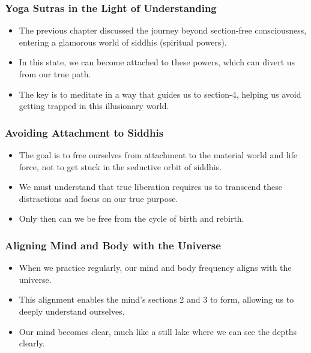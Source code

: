 \begin{frame}[fragile]\frametitle{Yoga Sutras in the Light of Understanding}
    \begin{itemize}
        \item The previous chapter discussed the journey beyond section-free consciousness, entering a glamorous world of siddhis (spiritual powers).
        \item In this state, we can become attached to these powers, which can divert us from our true path.
        \item The key is to meditate in a way that guides us to section-4, helping us avoid getting trapped in this illusionary world.
    \end{itemize}
\end{frame}

\begin{frame}[fragile]\frametitle{Avoiding Attachment to Siddhis}
    \begin{itemize}
        \item The goal is to free ourselves from attachment to the material world and life force, not to get stuck in the seductive orbit of siddhis.
        \item We must understand that true liberation requires us to transcend these distractions and focus on our true purpose.
        \item Only then can we be free from the cycle of birth and rebirth.
    \end{itemize}
\end{frame}

\begin{frame}[fragile]\frametitle{Aligning Mind and Body with the Universe}
    \begin{itemize}
        \item When we practice regularly, our mind and body frequency aligns with the universe.
        \item This alignment enables the mind's sections 2 and 3 to form, allowing us to deeply understand ourselves.
        \item Our mind becomes clear, much like a still lake where we can see the depths clearly.
    \end{itemize}
\end{frame}

